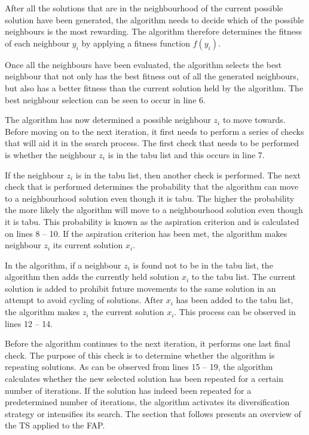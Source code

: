 After all the solutions that are in the neighbourhood of the current possible solution have been generated, the algorithm needs to decide which of the possible neighbours is the most rewarding. The algorithm therefore determines the fitness of each neighbour $y_i$ by applying a fitness function $f(y_i)$. 

Once all the neighbours have been evaluated, the algorithm selects the best neighbour that not only has the best fitness out of all the generated neighbours, but also has a better fitness than the current solution held by the algorithm. The best neighbour selection can be seen to occur in line 6.

The algorithm has now determined a possible neighbour $z_i$ to move towards. Before moving on to the next iteration, it first needs to perform a series of checks that will aid it in the search process. The first check that needs to be performed is whether the neighbour $z_i$ is in the tabu list and this occurs in line 7. 

If the neighbour $z_i$ is in the tabu list, then another check is performed. The next check that is performed determines the probability that the algorithm can move to a neighbourhood solution even though it is tabu. The higher the probability the more likely the algorithm will move to a neighbourhood solution even though it is tabu. This probability is known as the aspiration criterion and is calculated on lines 8 -- 10. If the aspiration criterion has been met, the algorithm makes neighbour $z_i$ its current solution $x_i$.

In the algorithm, if a neighbour $z_i$ is found not to be in the tabu list, the algorithm then adds the currently held solution $x_i$ to the tabu list. The current solution is added to prohibit future movements to the same solution in an attempt to avoid cycling of solutions. After $x_i$ has been added to the tabu list, the algorithm makes $z_i$ the current solution $x_i$. This process can be observed in lines 12 -- 14.

Before the algorithm continues to the next iteration, it performs one last final check. The purpose of this check is to determine whether the algorithm is repeating solutions. As can be observed from lines 15 -- 19, the algorithm calculates whether the new selected solution has been repeated for a certain number of iterations. If the solution has indeed been repeated for a predetermined number of iterations, the algorithm activates its diversification strategy or intensifies its search.
The section that follows presents an overview of the \gls{TS} applied to the \gls{FAP}.
